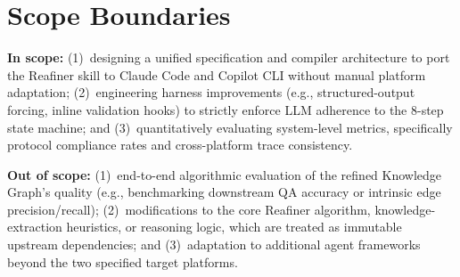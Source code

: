 \documentclass[10pt,a4paper]{article}
\begin{document}
\small
\section{Scope Boundaries}
\small
\textbf{In scope:} (1)~designing a unified specification and compiler architecture to port the Reafiner skill to Claude Code and Copilot CLI without manual platform adaptation; (2)~engineering harness improvements (e.g., structured-output forcing, inline validation hooks) to strictly enforce LLM adherence to the 8-step state machine; and (3)~quantitatively evaluating system-level metrics, specifically protocol compliance rates and cross-platform trace consistency.

\textbf{Out of scope:} (1)~end-to-end algorithmic evaluation of the refined Knowledge Graph's quality (e.g., benchmarking downstream QA accuracy or intrinsic edge precision/recall); (2)~modifications to the core Reafiner algorithm, knowledge-extraction heuristics, or reasoning logic, which are treated as immutable upstream dependencies; and (3)~adaptation to additional agent frameworks beyond the two specified target platforms.
\end{document}
